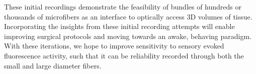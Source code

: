 These initial recordings demonstrate the feasibility of bundles of 
hundreds or thousands of microfibers as an interface to optically 
access 3D volumes of tissue. Incorporating the insights from these 
initial recording attempts will enable improving surgical protocols 
and moving towards an awake, behaving paradigm. With these iterations,
 we hope to improve sensitivity to sensory evoked fluorescence 
activity, such that it can be reliability recorded through both the 
small and large diameter fibers.


